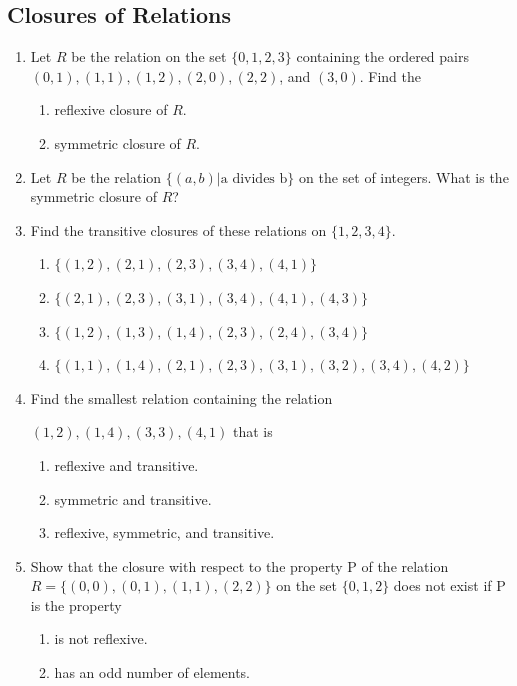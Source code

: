 \documentclass{sig-alternate-05-2015}
\begin{document}
\subsection{Closures of Relations}
\begin{enumerate}
\item Let $R$ be the relation on the set $\{0, 1, 2, 3\}$ containing the ordered pairs $(0, 1), (1, 1), (1, 2), (2, 0), (2, 2)$, and $(3, 0)$. Find the
	\begin{enumerate}
		\item reflexive closure of $R$.
		\item symmetric closure of $R$.
	\end{enumerate}

\item Let $R$ be the relation $\{(a, b) | \text{a divides b}\}$ on the set of
integers. What is the symmetric closure of $R$?
	
\item Find the transitive closures of these relations on $\{1, 2, 3, 4\}$.
	\begin{enumerate}
		\item $\{(1, 2), (2,1), (2,3), (3,4), (4,1)\}$
		\item $\{(2, 1), (2,3), (3,1), (3,4), (4,1), (4, 3)\}$
		\item $\{(1, 2), (1,3), (1,4), (2,3), (2,4), (3, 4)\}$
		\item $\{(1, 1), (1,4), (2,1), (2,3), (3,1), (3, 2), (3,4), (4, 2)\}$
	\end{enumerate}
	
\item Find the smallest relation containing the relation
	
	${(1, 2), (1, 4), (3, 3), (4, 1)}$ that is
	\begin{enumerate}
		\item reflexive and transitive.
		\item symmetric and transitive.
		\item reflexive, symmetric, and transitive.
	\end{enumerate}
	
\item Show that the closure with respect to the property P of
the relation $R = \{(0, 0), (0, 1), (1, 1), (2, 2)\}$ on the set
$\{0, 1, 2\}$ does not exist if P is the property
	\begin{enumerate}
		\item is not reflexive.
		\item has an odd number of elements.
	\end{enumerate}
\end{enumerate}
\end{document}
